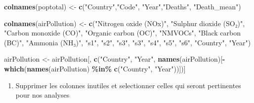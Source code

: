\documentclass[
]{article}
\newenvironment{Shaded}{\begin{snugshade}}{\end{snugshade}}
\newcommand{\FunctionTok}[1]{\textcolor[rgb]{0.13,0.29,0.53}{\textbf{#1}}}
\newcommand{\NormalTok}[1]{#1}
\newcommand{\OtherTok}[1]{\textcolor[rgb]{0.56,0.35,0.01}{#1}}
\newcommand{\SpecialCharTok}[1]{\textcolor[rgb]{0.81,0.36,0.00}{\textbf{#1}}}
\newcommand{\StringTok}[1]{\textcolor[rgb]{0.31,0.60,0.02}{#1}}
\providecommand{\tightlist}{%
  \setlength{\itemsep}{0pt}\setlength{\parskip}{0pt}}
\begin{document}
\begin{Shaded}
\begin{Highlighting}[]
\FunctionTok{colnames}\NormalTok{(poptotal) }\OtherTok{\textless{}{-}} \FunctionTok{c}\NormalTok{(}\StringTok{"Country"}\NormalTok{,}\StringTok{"Code"}\NormalTok{, }\StringTok{"Year"}\NormalTok{,}\StringTok{"Deaths"}\NormalTok{, }\StringTok{"Death\_mean"}\NormalTok{)}

\FunctionTok{colnames}\NormalTok{(airPollution) }\OtherTok{\textless{}{-}} \FunctionTok{c}\NormalTok{(}\StringTok{"Nitrogen oxide (NOx)"}\NormalTok{, }\StringTok{"Sulphur dioxide (SO₂)"}\NormalTok{, }\StringTok{"Carbon monoxide (CO)"}\NormalTok{, }\StringTok{"Organic carbon (OC)"}\NormalTok{, }\StringTok{"NMVOCs"}\NormalTok{, }\StringTok{"Black carbon (BC)"}\NormalTok{, }\StringTok{"Ammonia (NH₃)"}\NormalTok{, }\StringTok{"s1"}\NormalTok{, }\StringTok{"s2"}\NormalTok{, }\StringTok{"s3"}\NormalTok{, }\StringTok{"s3"}\NormalTok{, }\StringTok{"s4"}\NormalTok{, }\StringTok{"s5"}\NormalTok{, }\StringTok{"s6"}\NormalTok{, }\StringTok{"Country"}\NormalTok{, }\StringTok{"Year"}\NormalTok{)}

\NormalTok{airPollution }\OtherTok{\textless{}{-}}\NormalTok{ airPollution[, }\FunctionTok{c}\NormalTok{(}\StringTok{"Country"}\NormalTok{, }\StringTok{"Year"}\NormalTok{, }\FunctionTok{names}\NormalTok{(airPollution)[}\SpecialCharTok{{-}}\FunctionTok{which}\NormalTok{(}\FunctionTok{names}\NormalTok{(airPollution) }\SpecialCharTok{\%in\%} \FunctionTok{c}\NormalTok{(}\StringTok{"Country"}\NormalTok{, }\StringTok{"Year"}\NormalTok{))])]}
\end{Highlighting}
\end{Shaded}

\begin{enumerate}
\def\labelenumi{\alph{enumi})}
\setcounter{enumi}{3}
\tightlist
\item
  Supprimer les colonnes inutiles et selectionner celles qui seront
  pertinentes pour nos analyses
\end{enumerate}
\end{document}
